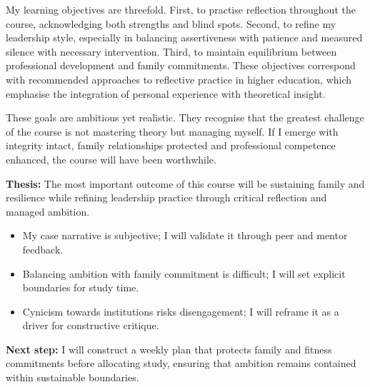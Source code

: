 My learning objectives are threefold. First, to practise reflection throughout the course, acknowledging both strengths and blind spots. Second, to refine my leadership style, especially in balancing assertiveness with patience and measured silence with necessary intervention. Third, to maintain equilibrium between professional development and family commitments. These objectives correspond with recommended approaches to reflective practice in higher education, which emphasise the integration of personal experience with theoretical insight.  

These goals are ambitious yet realistic. They recognise that the greatest challenge of the course is not mastering theory but managing myself. If I emerge with integrity intact, family relationships protected and professional competence enhanced, the course will have been worthwhile.  

\textbf{Thesis:} The most important outcome of this course will be sustaining family and resilience while refining leadership practice through critical reflection and managed ambition.  

\begin{itemize}
	\item My case narrative is subjective; I will validate it through peer and mentor feedback.  
	\item Balancing ambition with family commitment is difficult; I will set explicit boundaries for study time.  
	\item Cynicism towards institutions risks disengagement; I will reframe it as a driver for constructive critique.  
\end{itemize}

\textbf{Next step:} I will construct a weekly plan that protects family and fitness commitments before allocating study, ensuring that ambition remains contained within sustainable boundaries.  


